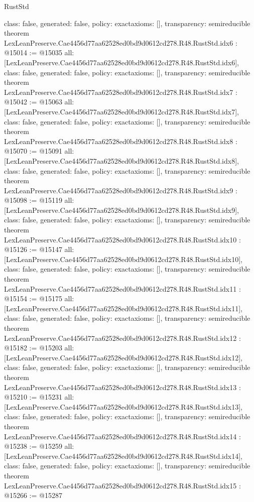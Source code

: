 \begin{lexlean}{RustStd}
\begin{coremodule}
{  class: false,
  generated: false,
  policy: exact{axioms: []},
  transparency: semireducible
}
theorem LexLeanPreserve.Cae4456d77aa62528ed0bd9d0612cd278.R48.RustStd.idx6 : @15014 := @15035 {
  all: [LexLeanPreserve.Cae4456d77aa62528ed0bd9d0612cd278.R48.RustStd.idx6],
  class: false,
  generated: false,
  policy: exact{axioms: []},
  transparency: semireducible
}
theorem LexLeanPreserve.Cae4456d77aa62528ed0bd9d0612cd278.R48.RustStd.idx7 : @15042 := @15063 {
  all: [LexLeanPreserve.Cae4456d77aa62528ed0bd9d0612cd278.R48.RustStd.idx7],
  class: false,
  generated: false,
  policy: exact{axioms: []},
  transparency: semireducible
}
theorem LexLeanPreserve.Cae4456d77aa62528ed0bd9d0612cd278.R48.RustStd.idx8 : @15070 := @15091 {
  all: [LexLeanPreserve.Cae4456d77aa62528ed0bd9d0612cd278.R48.RustStd.idx8],
  class: false,
  generated: false,
  policy: exact{axioms: []},
  transparency: semireducible
}
theorem LexLeanPreserve.Cae4456d77aa62528ed0bd9d0612cd278.R48.RustStd.idx9 : @15098 := @15119 {
  all: [LexLeanPreserve.Cae4456d77aa62528ed0bd9d0612cd278.R48.RustStd.idx9],
  class: false,
  generated: false,
  policy: exact{axioms: []},
  transparency: semireducible
}
theorem LexLeanPreserve.Cae4456d77aa62528ed0bd9d0612cd278.R48.RustStd.idx10 : @15126 := @15147 {
  all: [LexLeanPreserve.Cae4456d77aa62528ed0bd9d0612cd278.R48.RustStd.idx10],
  class: false,
  generated: false,
  policy: exact{axioms: []},
  transparency: semireducible
}
theorem LexLeanPreserve.Cae4456d77aa62528ed0bd9d0612cd278.R48.RustStd.idx11 : @15154 := @15175 {
  all: [LexLeanPreserve.Cae4456d77aa62528ed0bd9d0612cd278.R48.RustStd.idx11],
  class: false,
  generated: false,
  policy: exact{axioms: []},
  transparency: semireducible
}
theorem LexLeanPreserve.Cae4456d77aa62528ed0bd9d0612cd278.R48.RustStd.idx12 : @15182 := @15203 {
  all: [LexLeanPreserve.Cae4456d77aa62528ed0bd9d0612cd278.R48.RustStd.idx12],
  class: false,
  generated: false,
  policy: exact{axioms: []},
  transparency: semireducible
}
theorem LexLeanPreserve.Cae4456d77aa62528ed0bd9d0612cd278.R48.RustStd.idx13 : @15210 := @15231 {
  all: [LexLeanPreserve.Cae4456d77aa62528ed0bd9d0612cd278.R48.RustStd.idx13],
  class: false,
  generated: false,
  policy: exact{axioms: []},
  transparency: semireducible
}
theorem LexLeanPreserve.Cae4456d77aa62528ed0bd9d0612cd278.R48.RustStd.idx14 : @15238 := @15259 {
  all: [LexLeanPreserve.Cae4456d77aa62528ed0bd9d0612cd278.R48.RustStd.idx14],
  class: false,
  generated: false,
  policy: exact{axioms: []},
  transparency: semireducible
}
theorem LexLeanPreserve.Cae4456d77aa62528ed0bd9d0612cd278.R48.RustStd.idx15 : @15266 := @15287 {
}
\end{coremodule}
\end{lexlean}

